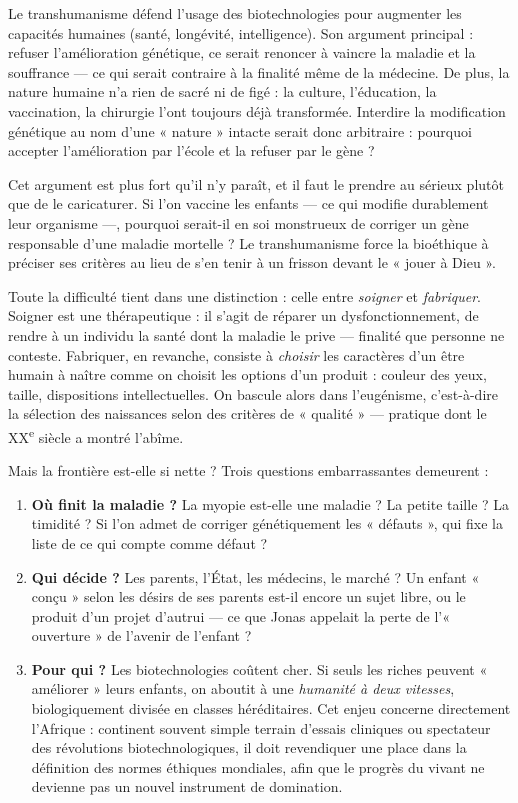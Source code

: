 \documentclass[11pt]{article}
\newcommand{\cle}[1]{{\popxbold\color{popdark}#1}}
\newcounter{popsec}
\newcounter{popsub}
\newcommand{\courssub}[1]{%
  \stepcounter{popsub}%
  \par\vspace{9pt}\noindent{\popxbold\fontsize{11.5}{13}\selectfont\color{popink}{\color{poporange}\thepopsec.\thepopsub}\hspace{6pt}#1}\par\nopagebreak\vspace{4pt}
}
\begin{document}
\begin{propriete}
Le transhumanisme défend l'usage des biotechnologies pour augmenter les capacités humaines (santé, longévité, intelligence). Son argument principal : refuser l'amélioration génétique, ce serait renoncer à vaincre la maladie et la souffrance — ce qui serait contraire à la finalité même de la médecine. De plus, la nature humaine n'a rien de sacré ni de figé : la culture, l'éducation, la vaccination, la chirurgie l'ont toujours déjà transformée. Interdire la modification génétique au nom d'une « nature » intacte serait donc arbitraire : pourquoi accepter l'amélioration par l'école et la refuser par le gène ?
\end{propriete}

Cet argument est plus fort qu'il n'y paraît, et il faut le prendre au sérieux plutôt que de le caricaturer. Si l'on vaccine les enfants — ce qui modifie durablement leur organisme —, pourquoi serait-il en soi monstrueux de corriger un gène responsable d'une maladie mortelle ? Le transhumanisme force la bioéthique à préciser ses critères au lieu de s'en tenir à un frisson devant le « jouer à Dieu ».

\courssub{Discussion critique : où placer la limite ?}

Toute la difficulté tient dans une distinction : celle entre \emph{soigner} et \emph{fabriquer}. Soigner est une \cle{thérapeutique} : il s'agit de réparer un dysfonctionnement, de rendre à un individu la santé dont la maladie le prive — finalité que personne ne conteste. Fabriquer, en revanche, consiste à \emph{choisir} les caractères d'un être humain à naître comme on choisit les options d'un produit : couleur des yeux, taille, dispositions intellectuelles. On bascule alors dans l'\cle{eugénisme}, c'est-à-dire la sélection des naissances selon des critères de « qualité » — pratique dont le XX\textsuperscript{e} siècle a montré l'abîme.

Mais la frontière est-elle si nette ? Trois questions embarrassantes demeurent :
\begin{enumerate}
\item \textbf{Où finit la maladie ?} La myopie est-elle une maladie ? La petite taille ? La timidité ? Si l'on admet de corriger génétiquement les « défauts », qui fixe la liste de ce qui compte comme défaut ?
\item \textbf{Qui décide ?} Les parents, l'État, les médecins, le marché ? Un enfant « conçu » selon les désirs de ses parents est-il encore un sujet libre, ou le produit d'un projet d'autrui — ce que Jonas appelait la perte de l'« ouverture » de l'avenir de l'enfant ?
\item \textbf{Pour qui ?} Les biotechnologies coûtent cher. Si seuls les riches peuvent « améliorer » leurs enfants, on aboutit à une \emph{humanité à deux vitesses}, biologiquement divisée en classes héréditaires. Cet enjeu concerne directement l'Afrique : continent souvent simple terrain d'essais cliniques ou spectateur des révolutions biotechnologiques, il doit revendiquer une place dans la définition des normes éthiques mondiales, afin que le progrès du vivant ne devienne pas un nouvel instrument de domination.
\end{enumerate}
\end{document}
